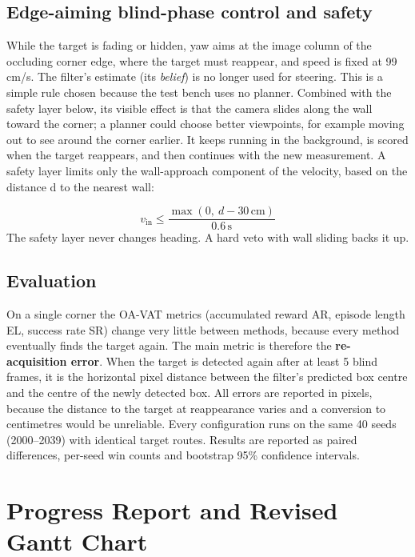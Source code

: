 \documentclass[12pt,a4paper]{article}
\begin{document}
\subsection{Edge-aiming blind-phase control and safety}
While the target is fading or hidden, yaw aims at the image column of the occluding corner edge, where the target must reappear, and speed is fixed at 99 cm/s. The filter's estimate (its \emph{belief}) is no longer used for steering. This is a simple rule chosen because the test bench uses no planner. Combined with the safety layer below, its visible effect is that the camera slides along the wall toward the corner; a planner could choose better viewpoints, for example moving out to see around the corner earlier. It keeps running in the background, is scored when the target reappears, and then continues with the new measurement. A safety layer limits only the wall-approach component of the velocity, based on the distance d to the nearest wall:

\begin{equation}
  v_{\mathrm{in}} \le \frac{\max(0,\ d-30\,\mathrm{cm})}{0.6\,\mathrm{s}}
\end{equation}
The safety layer never changes heading. A hard veto with wall sliding backs it up.

\subsection{Evaluation}
On a single corner the OA-VAT metrics (accumulated reward AR, episode length EL, success rate SR) change very little between methods, because every method eventually finds the target again. The main metric is therefore the \textbf{re-acquisition error}. When the target is detected again after at least 5 blind frames, it is the horizontal pixel distance between the filter’s predicted box centre and the centre of the newly detected box. All errors are reported in pixels, because the distance to the target at reappearance varies and a conversion to centimetres would be unreliable. Every configuration runs on the same 40 seeds (2000–2039) with identical target routes. Results are reported as paired differences, per-seed win counts and bootstrap 95\% confidence intervals.

\section{Progress Report and Revised Gantt Chart}
\end{document}
